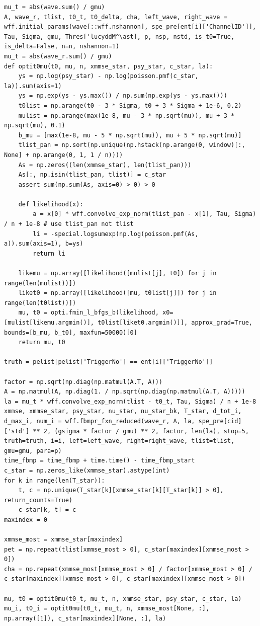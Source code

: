 \documentclass[notitlepage]{article}
\begin{document}
\begin{lstlisting}
mu_t = abs(wave.sum() / gmu)
A, wave_r, tlist, t0_t, t0_delta, cha, left_wave, right_wave = wff.initial_params(wave[::wff.nshannon], spe_pre[ent[i]['ChannelID']], Tau, Sigma, gmu, Thres['lucyddM^\ast], p, nsp, nstd, is_t0=True, is_delta=False, n=n, nshannon=1)
mu_t = abs(wave_r.sum() / gmu)
def optit0mu(t0, mu, n, xmmse_star, psy_star, c_star, la):
    ys = np.log(psy_star) - np.log(poisson.pmf(c_star, la)).sum(axis=1)
    ys = np.exp(ys - ys.max()) / np.sum(np.exp(ys - ys.max()))
    t0list = np.arange(t0 - 3 * Sigma, t0 + 3 * Sigma + 1e-6, 0.2)
    mulist = np.arange(max(1e-8, mu - 3 * np.sqrt(mu)), mu + 3 * np.sqrt(mu), 0.1)
    b_mu = [max(1e-8, mu - 5 * np.sqrt(mu)), mu + 5 * np.sqrt(mu)]
    tlist_pan = np.sort(np.unique(np.hstack(np.arange(0, window)[:, None] + np.arange(0, 1, 1 / n))))
    As = np.zeros((len(xmmse_star), len(tlist_pan)))
    As[:, np.isin(tlist_pan, tlist)] = c_star
    assert sum(np.sum(As, axis=0) > 0) > 0

    def likelihood(x):
        a = x[0] * wff.convolve_exp_norm(tlist_pan - x[1], Tau, Sigma) / n + 1e-8 # use tlist_pan not tlist
        li = -special.logsumexp(np.log(poisson.pmf(As, a)).sum(axis=1), b=ys)
        return li

    likemu = np.array([likelihood([mulist[j], t0]) for j in range(len(mulist))])
    liket0 = np.array([likelihood([mu, t0list[j]]) for j in range(len(t0list))])
    mu, t0 = opti.fmin_l_bfgs_b(likelihood, x0=[mulist[likemu.argmin()], t0list[liket0.argmin()]], approx_grad=True, bounds=[b_mu, b_t0], maxfun=50000)[0]
    return mu, t0

truth = pelist[pelist['TriggerNo'] == ent[i]['TriggerNo']]

factor = np.sqrt(np.diag(np.matmul(A.T, A)))
A = np.matmul(A, np.diag(1. / np.sqrt(np.diag(np.matmul(A.T, A)))))
la = mu_t * wff.convolve_exp_norm(tlist - t0_t, Tau, Sigma) / n + 1e-8
xmmse, xmmse_star, psy_star, nu_star, nu_star_bk, T_star, d_tot_i, d_max_i, num_i = wff.fbmpr_fxn_reduced(wave_r, A, la, spe_pre[cid]['std'] ** 2, (gsigma * factor / gmu) ** 2, factor, len(la), stop=5, truth=truth, i=i, left=left_wave, right=right_wave, tlist=tlist, gmu=gmu, para=p)
time_fbmp = time_fbmp + time.time() - time_fbmp_start
c_star = np.zeros_like(xmmse_star).astype(int)
for k in range(len(T_star)):
    t, c = np.unique(T_star[k][xmmse_star[k][T_star[k]] > 0], return_counts=True)
    c_star[k, t] = c
maxindex = 0

xmmse_most = xmmse_star[maxindex]
pet = np.repeat(tlist[xmmse_most > 0], c_star[maxindex][xmmse_most > 0])
cha = np.repeat(xmmse_most[xmmse_most > 0] / factor[xmmse_most > 0] / c_star[maxindex][xmmse_most > 0], c_star[maxindex][xmmse_most > 0])

mu, t0 = optit0mu(t0_t, mu_t, n, xmmse_star, psy_star, c_star, la)
mu_i, t0_i = optit0mu(t0_t, mu_t, n, xmmse_most[None, :], np.array([1]), c_star[maxindex][None, :], la)
\end{lstlisting}
\end{document}
